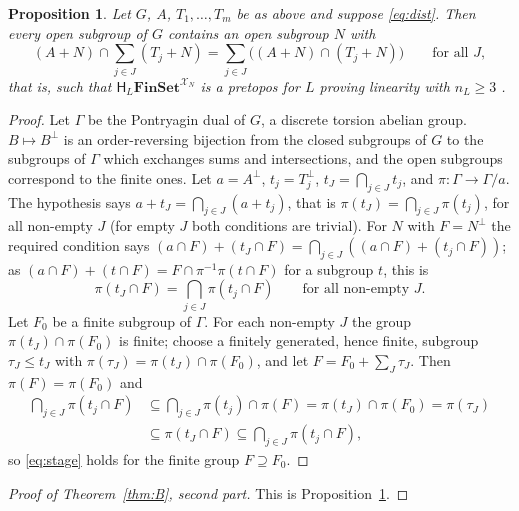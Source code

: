\documentclass[11pt]{amsart}
\newtheorem{prop}[thm]{Proposition}
\theoremstyle{definition}
\newcommand{\Fin}{\mathbf{FinSet}}
\newcommand{\HH}{\mathsf H}
\newcommand{\cX}{\mathcal X}
\begin{document}
\begin{prop}\label{prop:cofinalN}
Let $G$, $A$, $T_1,\dots,T_m$ be as above and
suppose \eqref{eq:dist}.
Then every open subgroup of $G$ contains an open subgroup $N$ with
\[
(A+N)\cap\sum_{j\in J}(T_j+N)=\sum_{j\in J}\bigl((A+N)\cap(T_j+N)\bigr)
\qquad\text{for all }J,
\]
that is, such that $\HH_L\Fin^{\cX_N}$ is a pretopos for $L$ proving
linearity with $n_L\ge3$
\cite[Prop.~6.11]{Strings}.
\end{prop}
\begin{proof}
Let $\Gamma$ be the Pontryagin dual of $G$, a discrete torsion abelian
group. $B\mapsto B^\perp$ is an order-reversing bijection from the
closed subgroups of $G$ to the subgroups of $\Gamma$ which exchanges
sums and intersections, and the open subgroups correspond to the
finite ones. Let $a=A^\perp$, $t_j=T_j^\perp$, $t_J=\bigcap_{j\in J}
t_j$, and $\pi\colon\Gamma\to\Gamma/a$. The hypothesis says $a+t_J=
\bigcap_{j\in J}(a+t_j)$, that is $\pi(t_J)=\bigcap_{j\in J}\pi(t_j)$,
for all non-empty $J$ (for empty $J$ both conditions are trivial). For
$N$ with $F=N^\perp$ the required condition says $(a\cap F)+(t_J\cap
F)=\bigcap_{j\in J}((a\cap F)+(t_j\cap F))$; as $(a\cap F)+(t\cap F)=
F\cap\pi^{-1}\pi(t\cap F)$ for a subgroup $t$, this is
\begin{equation}\label{eq:stage}
\pi(t_J\cap F)=\bigcap_{j\in J}\pi(t_j\cap F)\qquad\text{for all
non-empty }J.
\end{equation}
Let $F_0$ be a finite subgroup of $\Gamma$. For each non-empty $J$ the
group $\pi(t_J)\cap\pi(F_0)$ is finite; choose a finitely generated,
hence finite, subgroup $\tau_J\le t_J$ with $\pi(\tau_J)=\pi(t_J)\cap
\pi(F_0)$, and let $F=F_0+\sum_J\tau_J$. Then $\pi(F)=\pi(F_0)$ and
\[
\begin{aligned}
\bigcap_{j\in J}\pi(t_j\cap F)&\subseteq\bigcap_{j\in J}\pi(t_j)\cap
\pi(F)=\pi(t_J)\cap\pi(F_0)=\pi(\tau_J)\\
&\subseteq\pi(t_J\cap F)
\subseteq\bigcap_{j\in J}\pi(t_j\cap F),
\end{aligned}
\]
so \eqref{eq:stage} holds for the finite group $F\supseteq F_0$.
\end{proof}


\begin{proof}[Proof of Theorem~\ref{thm:B}, second part]
This is Proposition~\ref{prop:cofinalN}.
\end{proof}
\end{document}
